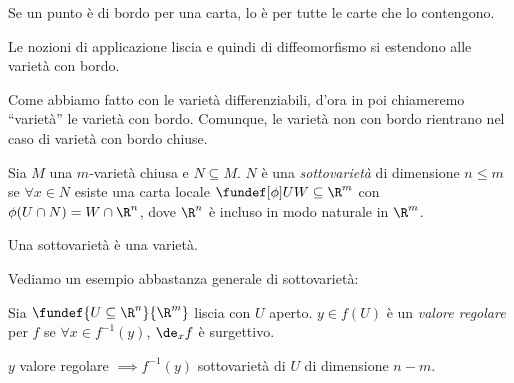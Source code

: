 \begin{ex}
	Se un punto è di bordo per una carta,
	lo è per tutte le carte che lo contengono.
\end{ex}

\begin{fat}
	Le nozioni di applicazione liscia
	e quindi di diffeomorfismo
	si estendono alle varietà con bordo.
\end{fat}

Come abbiamo fatto con le varietà differenziabili,
d'ora in poi chiameremo ``varietà'' le varietà con bordo.
Comunque,
le varietà non con bordo rientrano nel caso
di varietà con bordo chiuse.


\begin{defn}[Sottovarietà]
	Sia $M$ una $m$-varietà chiusa e $N\subseteq M$.
	$N$ è una \emph{sottovarietà} di dimensione $n\le m$ se
	$\forall x\in N$ esiste una carta locale $\fundef[\phi]U{W\subseteq\R^m}$
	con $\phi(U\cap N)=W\cap\R^n$,
	dove $\R^n$ è incluso in modo naturale in $\R^m$.
\end{defn}

\begin{oss}
	Una sottovarietà è una varietà.
\end{oss}

Vediamo un esempio abbastanza generale di sottovarietà:

\begin{defn}
	Sia $\fundef{U\subseteq\R^n}{\R^m}$ liscia con $U$ aperto.
 	$y\in f(U)$ è un \emph{valore regolare} per $f$ se
	$\forall x\in f^{-1}(y)$, $\de_xf$ è surgettivo.
\end{defn}

\begin{prop}
	$y$ valore regolare $\implies
	f^{-1}(y)$ sottovarietà di $U$ di dimensione $n-m$.
\end{prop}

